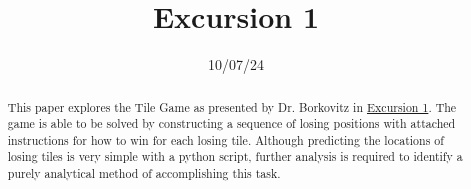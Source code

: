 \documentclass[11pt, letterpaper]{article}
\title{Excursion 1}
\date{10/07/24}
\begin{document}
\makereport
\begin{abstract}
	This paper explores the Tile Game as presented by Dr. Borkovitz in \href{https://learn-us-east-1-prod-fleet02-xythos.content.blackboardcdn.com/5deff46c33361/63408239?X-Blackboard-S3-Bucket=learn-us-east-1-prod-fleet01-xythos&X-Blackboard-Expiration=1727233200000&X-Blackboard-Signature=%2BLd6DplgbKYaPIhXzAfJOapwJ31XQ%2BUqah9dEZcpI7Q%3D&X-Blackboard-Client-Id=100902&X-Blackboard-S3-Region=us-east-1&response-cache-control=private%2C%20max-age%3D21600&response-content-disposition=inline%3B%20filename%2A%3DUTF-8%27%27Excursion%25201%2520--%2520Two-Color%2520Tile%2520Game.pdf&response-content-type=application%2Fpdf&X-Amz-Security-Token=IQoJb3JpZ2luX2VjEKb%2F%2F%2F%2F%2F%2F%2F%2F%2F%2FwEaCXVzLWVhc3QtMSJIMEYCIQDSXqYP%2FpIapJ1okMpHrDOF96Mj6KJ2HiOAPRhCUYdBrgIhAMeJyrkIpvOi7XZGKZEG2tI4w60vXL49gwWXdVgsehGhKr0FCN%2F%2F%2F%2F%2F%2F%2F%2F%2F%2F%2FwEQBBoMNjM1NTY3OTI0MTgzIgw88BMjLNBz0f6mSKIqkQVKztDxRyCG%2FNRn%2B9jZII4iSCKCEUOJtIxenwpdRh3sGilxQNwIyBBic%2Fbd7ZEEyqA0%2BDTDm3ViBOJs4vEMn2GzVUOFgOXrLRELRpgqP42QNRDNtfES3iFsS1fAKgBPHZKzGPupRwkK76nZdQUVc9Q4tB4co3xoh%2Fs2hsFrj%2FCilTkzjfpYeo5n626p3O51hT1yKT6yYr%2F0NPZbvQL%2BflsAUNTvFF2722mUneEfNeRdhTwF7v7snoZSudcA2Wuq77nGe5DFc4yrZBNIvK1j3RcnX9amVSYkQ7g06cXaTdaCT1K0PeC0tEnyjkvZV%2FB%2BfwKHT5Akfqbjw274z9EuueSXd7xGdBTATcBO%2BssH1C8AyErQXmLD5vZM6YJWeHFQn4NaKvirAmVY7cmfU2yviO9es8WGasmluK7A1a36eJzNBI1AbSwQSgEYcEI7FTbQ2Bq1gEA6sE37Wz%2FL0Ze7rbhtx6GwQB%2FkEEWNI2852T2jhj5k6LBviJBuPTQVBHRPqIVpJ7aXzT%2BX0ayg1MiTtyH7UKOdE6L2jEUYFAbQmpYyUh9liq9XP5%2FQ9lNgGlQJHrX5xwgUec2MYYjZUwn2edAVeT6EOiIHLAMyo3jNSpm3BfdjBe7WO1wqPEz0zIbQu3mmVBsQ4cclxL1bdw9QNXgd3YZXg2bF15Mbf8rtDRCfguj9qojgUeNqlb%2BgVYPGnFCa%2BvGxqsCaw853bIXX36d7PRS0VC14vCea6zx9aTxjzXhu6x%2B9KRxmQ6cyvXlVv5XekKsFf4M2oIX2B0kB79KiQR3%2FsIdHO%2FJ1%2Bste3qR1r2B8iAsMczaHQ2FJ8x9ZdZugt9Zk9OWVMNrfq%2FkzkUGCqb6sKY7XlTJf208tNlI4RLMwxdzMtwY6sAHYOMGNr6%2FHAqQdHO9Zcm4unJDaC4yKtZoWGHY%2F8Opkgxh%2F%2F9aiSyFZHcQYDooSqWtNq0CCsSSgx%2FKmzy2zeiydL7wyqRWoOl4SZDWwqpPTEbg3bDFKOvivvcf6ELUUovHjvXN3XGR1dlEJnFwQXn2o3kqWfCKA4jy0FaxLTxib81HUj%2FCBYl%2BkXgOCYmCtiEo2HLSTCmmumMl5xpi56wg2Vxutn%2Bl07YXvCbivPCwb%2BQ%3D%3D&X-Amz-Algorithm=AWS4-HMAC-SHA256&X-Amz-Date=20240924T210000Z&X-Amz-SignedHeaders=host&X-Amz-Expires=21600&X-Amz-Credential=ASIAZH6WM4PLS3QCJACU%2F20240924%2Fus-east-1%2Fs3%2Faws4_request&X-Amz-Signature=bf03a5beef9b10e472db1774d0a75240f2351b48ac548e07a0095804393cb1bd}{Excursion 1}. The game is able to be solved by constructing a sequence of losing positions with attached instructions for how to win for each losing tile. Although predicting the locations of losing tiles is very simple with a python script, further analysis is required to identify a purely analytical method of accomplishing this task.


\end{abstract}
\end{document}
